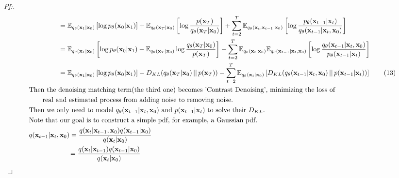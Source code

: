 \documentclass{article}
\begin{document}
\begin{proof}[\textit{Pf:}]
\begin{align}
        &\qquad\qquad\,\, = \mathbb{E}_{q_{\theta}(\mathbf{x}_{1}|\mathbf{x}_0)}\left[\log p_{\theta}(\mathbf{x}_0|\mathbf{x}_1) \right]
        + \mathbb{E}_{q_{\theta}(\mathbf{x}_{T}|\mathbf{x}_0)}\left[ \log \frac{p(\mathbf{x}_{T})}{q_{\theta}(\mathbf{x}_{T}|\mathbf{x}_0)} \right]
        + \sum_{t = 2}^{T} \mathbb{E}_{q_{\theta}(\mathbf{x}_{t}, \mathbf{x}_{t-1}|\mathbf{x}_0)}\left[ \log \frac{p_{\theta}(\mathbf{x}_{t-1}|\mathbf{x}_t)}{q_{\theta}(\mathbf{x}_{t-1}|\mathbf{x}_t,\mathbf{x}_0)} \right] \notag \\
        &\qquad\qquad\,\, = \mathbb{E}_{q_{\theta}(\mathbf{x}_{1}|\mathbf{x}_0)} \left[\log p_{\theta}(\mathbf{x}_0|\mathbf{x}_1)
        - \mathbb{E}_{q_{\theta}(\mathbf{x}_{T}|\mathbf{x}_0)} \log \frac{q_{\theta}(\mathbf{x}_{T}|\mathbf{x}_0)}{p(\mathbf{x}_{T})} \right]
        - \sum_{t = 2}^{T} \mathbb{E}_{q_{\theta}(\mathbf{x}_{t}|\mathbf{x}_0)} \mathbb{E}_{q_{\theta}(\mathbf{x}_{t-1}| \mathbf{x}_{t},\mathbf{x}_0)}\left[ \log \frac{q_{\theta}(\mathbf{x}_{t-1}|\mathbf{x}_{t}, \mathbf{x}_0)}{p_{\theta}(\mathbf{x}_{t-1}|\mathbf{x}_{t})} \right] \notag \\
        &\qquad\qquad\,\, = \mathbb{E}_{q_{\theta}(\mathbf{x}_1|\mathbf{x}_0)} \left[ \log p_{\theta}(\mathbf{x}_0|\mathbf{x}_1) \right]
        - D_{KL}(q_{\theta}(\mathbf{x}_{T}| \mathbf{x}_{0})\, || \,p(\mathbf{x}_T))
        - \sum_{t = 2}^{T} \mathbb{E}_{q_{\theta}(\mathbf{x}_{t}|\mathbf{x}_0)} \left[D_{KL}(q_{\theta}(\mathbf{x}_{t-1}| \mathbf{x}_{t},\mathbf{x}_{0})\, || \,p(\mathbf{x}_{t-1} | \mathbf{x}_{t}))\right] \tag{13} \\
        &\text{Then the denoising matching term(the third one) becomes 'Contrast Denoising', minimizing the loss of } \notag \\
        &\qquad \text{real and estimated process from adding noise to removing noise.} \notag \\
        &\text{Then we only need to model }q_{\theta}(\mathbf{x}_{t-1}| \mathbf{x}_{t},\mathbf{x}_{0}) \text{ and } p(\mathbf{x}_{t-1} | \mathbf{x}_{t}) \text{ to solve their }D_{KL}\text{.} \notag \\
        &\text{Note that our goal is to construct a simple pdf, for example, a Gaussian pdf.} \notag \\
        &q(\mathbf{x}_{t-1} | \mathbf{x}_{t}, \mathbf{x}_0) = \frac{q(\mathbf{x}_{t} | \mathbf{x}_{t-1}, \mathbf{x}_0)q(\mathbf{x}_{t-1}|\mathbf{x}_0)}{q(\mathbf{x}_{t}|\mathbf{x}_0)} \notag \\
        &\qquad\qquad\quad\,\,\,\,\, = \frac{q(\mathbf{x}_{t} | \mathbf{x}_{t-1})q(\mathbf{x}_{t-1}|\mathbf{x}_0)}{q(\mathbf{x}_{t}|\mathbf{x}_0)} \notag \\

\end{align}
\end{proof}
\end{document}
